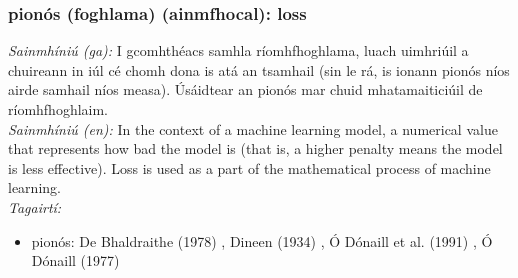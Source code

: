 \subsubsection*{pionós (foghlama) (ainmfhocal): loss}
 \noindent \textit{Sainmhíniú (ga):} I gcomhthéacs samhla ríomhfhoghlama, luach uimhriúil a chuireann in iúl cé chomh dona is atá an tsamhail (sin le rá, is ionann pionós níos airde samhail níos measa). Úsáidtear an pionós mar chuid mhatamaiticiúil de ríomhfhoghlaim.
\\
 \noindent \textit{Sainmhíniú (en):} In the context of a machine learning model, a numerical value that represents how bad the model is (that is, a higher penalty means the model is less effective). Loss is used as a part of the mathematical process of machine learning.
\\
 \noindent \textit{Tagairtí:}
\begin{itemize}
	\item pionós: De Bhaldraithe (1978) \cite{de-bhaldraithe}, Dineen (1934) \cite{dineen}, Ó Dónaill et al. (1991) \cite{focloir-beag}, Ó Dónaill (1977) \cite{odonaill}
\end{itemize}

